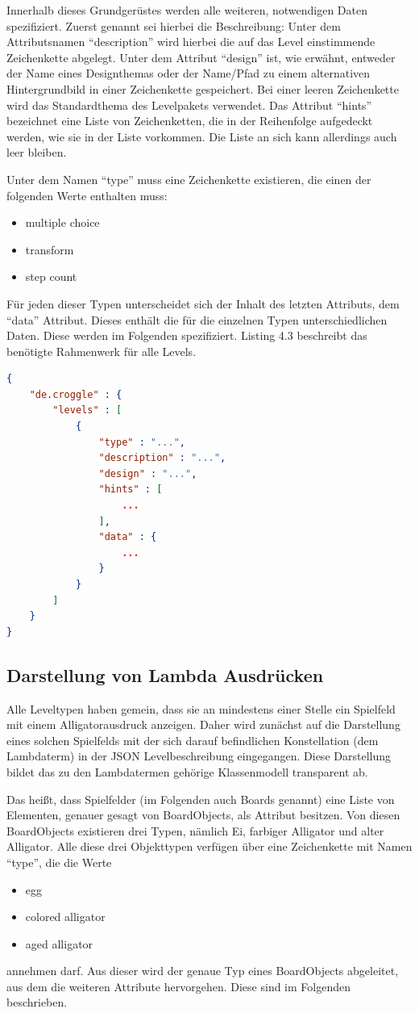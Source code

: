 Innerhalb dieses Grundgerüstes werden alle weiteren, notwendigen Daten spezifiziert.
Zuerst genannt sei hierbei die Beschreibung: Unter dem Attributsnamen "`description"' wird hierbei die auf das Level einstimmende Zeichenkette abgelegt.
Unter dem Attribut "`design"' ist, wie erwähnt, entweder der Name eines Designthemas oder der Name/Pfad zu einem alternativen Hintergrundbild in einer Zeichenkette gespeichert.
Bei einer leeren Zeichenkette wird das Standardthema des Levelpakets verwendet.
Das Attribut "`hints"' bezeichnet eine Liste von Zeichenketten, die in der Reihenfolge aufgedeckt werden, wie sie in der Liste vorkommen.
Die Liste an sich kann allerdings auch leer bleiben.

Unter dem Namen "`type"' muss eine Zeichenkette existieren, die einen der folgenden Werte enthalten muss:
\begin{itemize}
	\item multiple choice
	\item transform
	\item step count
\end{itemize}

Für jeden dieser Typen unterscheidet sich der Inhalt des letzten Attributs, dem "`data"' Attribut.
Dieses enthält die für die einzelnen Typen unterschiedlichen Daten.
Diese werden im Folgenden spezifiziert.
Listing 4.3 beschreibt das benötigte Rahmenwerk für alle Levels.
\begin{lstlisting}[language=json,caption={JSON Leveldatei, z.B. json/00/00.json}]
{
	"de.croggle" : {
		"levels" : [
			{
				"type" : "...",
				"description" : "...",
				"design" : "...",
				"hints" : [
					...
				],
				"data" : {
					...
				}
			}
		]
	}
}
\end{lstlisting}

\subsection{Darstellung von Lambda Ausdrücken}
Alle Leveltypen haben gemein, dass sie an mindestens einer Stelle ein Spielfeld mit einem Alligatorausdruck anzeigen.
Daher wird zunächst auf die Darstellung eines solchen Spielfelds mit der sich darauf befindlichen Konstellation (dem Lambdaterm) in der JSON Levelbeschreibung eingegangen.
Diese Darstellung bildet das zu den Lambdatermen gehörige Klassenmodell transparent ab.


Das heißt, dass Spielfelder (im Folgenden auch Boards genannt) eine Liste von Elementen, genauer gesagt von BoardObjects, als Attribut besitzen.
Von diesen BoardObjects existieren drei Typen, nämlich Ei, farbiger Alligator und alter Alligator.
Alle diese drei Objekttypen verfügen über eine Zeichenkette mit Namen "`type"', die die Werte
\begin{itemize}
	\item egg
	\item colored alligator
	\item aged alligator
\end{itemize}
annehmen darf.
Aus dieser wird der genaue Typ eines BoardObjects abgeleitet, aus dem die weiteren Attribute hervorgehen.
Diese sind im Folgenden beschrieben.

